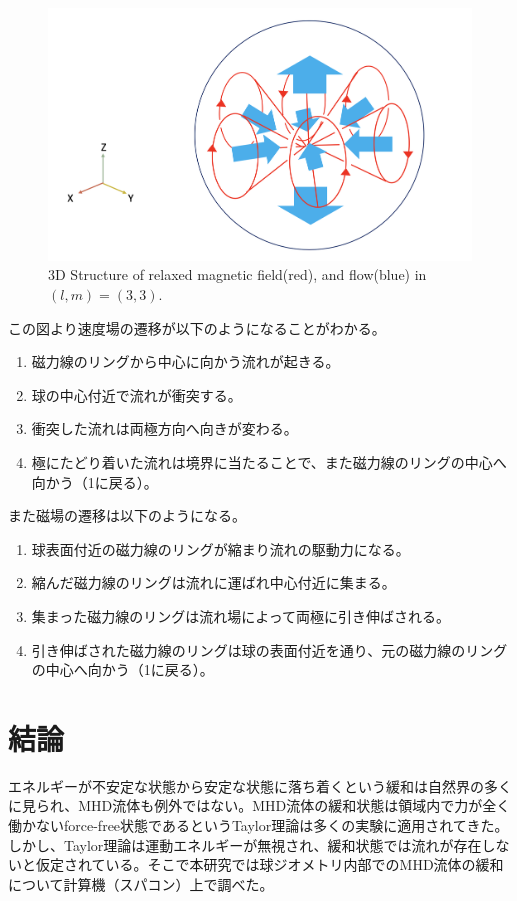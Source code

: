 \documentclass[12pt]{jsarticle}
\begin{document}
\begin{figure}[H]
\centering
\includegraphics[height=0.5\textheight,width=1.0\hsize,angle=0,keepaspectratio]{./Image/relaxedL3M3_cartoon.png}
\caption{3D Structure of relaxed magnetic field(red), and flow(blue) in $(l,m)=(3,3)$.}\label{L3M3_cartoon}
\end{figure}
\noindent
この図より速度場の遷移が以下のようになることがわかる。
\begin{enumerate}
\item 磁力線のリングから中心に向かう流れが起きる。
\item 球の中心付近で流れが衝突する。
\item 衝突した流れは両極方向へ向きが変わる。
\item 極にたどり着いた流れは境界に当たることで、また磁力線のリングの中心へ向かう（1に戻る）。
\end{enumerate}
また磁場の遷移は以下のようになる。
\begin{enumerate}
\item 球表面付近の磁力線のリングが縮まり流れの駆動力になる。
\item 縮んだ磁力線のリングは流れに運ばれ中心付近に集まる。
\item 集まった磁力線のリングは流れ場によって両極に引き伸ばされる。
\item 引き伸ばされた磁力線のリングは球の表面付近を通り、元の磁力線のリングの中心へ向かう（1に戻る）。
\end{enumerate}


\section{結論}
エネルギーが不安定な状態から安定な状態に落ち着くという緩和は自然界の多くに見られ、MHD流体も例外ではない。MHD流体の緩和状態は領域内で力が全く働かないforce-free状態であるというTaylor理論は多くの実験に適用されてきた。しかし、Taylor理論は運動エネルギーが無視され、緩和状態では流れが存在しないと仮定されている。そこで本研究では球ジオメトリ内部でのMHD流体の緩和について計算機（スパコン）上で調べた。
\end{document}
